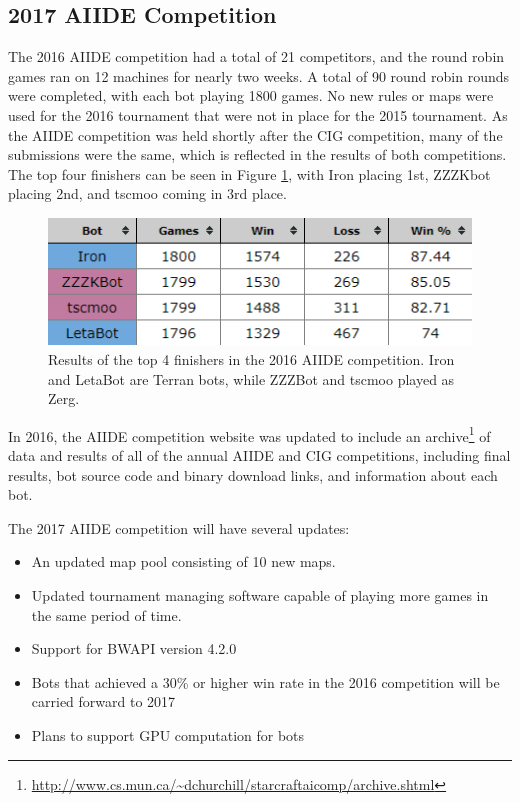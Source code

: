 \subsection{2017 AIIDE Competition}\label{subsecAIIDEnews}

The 2016 AIIDE competition had a total of 21 competitors, and the round robin games ran on 12 machines for nearly two weeks. A total of 90 round robin rounds were completed, with each bot playing 1800 games. No new rules or maps were used for the 2016 tournament that were not in place for the 2015 tournament. As the AIIDE competition was held shortly after the CIG competition, many of the submissions were the same, which is reflected in the results of both competitions. The top four finishers can be seen in Figure \ref{figAIIDEresults}, with Iron placing 1st, ZZZKbot placing 2nd, and tscmoo coming in 3rd place.

\vskip 2mm
\begin{figure}[h]
  \centering
  \includegraphics[width=1\columnwidth]{fig/aiide2016.png}
  \caption{Results of the top 4 finishers in the 2016 AIIDE competition. Iron and LetaBot are Terran bots, while ZZZBot and tscmoo played as Zerg.}
  \label{figAIIDEresults}
\end{figure}

In 2016, the AIIDE competition website was updated to include an archive\footnote{\url{http://www.cs.mun.ca/~dchurchill/starcraftaicomp/archive.shtml}} of data and results of all of the annual AIIDE and CIG competitions, including final results, bot source code and binary download links, and information about each bot. 

The 2017 AIIDE competition will have several updates:

\begin{itemize}
\item An updated map pool consisting of 10 new maps.
\item Updated tournament managing software capable of playing more games in the same period of time.
\item Support for BWAPI version 4.2.0
\item Bots that achieved a 30\% or higher win rate in the 2016 competition will be carried forward to 2017
\item Plans to support GPU computation for bots
\end{itemize}

\vskip 6mm